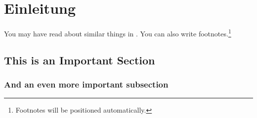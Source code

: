 \chapter{Einleitung}\label{ch:intro}

You may have read about similar things in \cite{Goodliffe2007}.
You can also write footnotes.\footnote{Footnotes will be positioned automatically.}
\blindtext

\blindtext

\section{This is an Important Section}
\blindtext

\subsection{And an even more important subsection}
\blindtext
